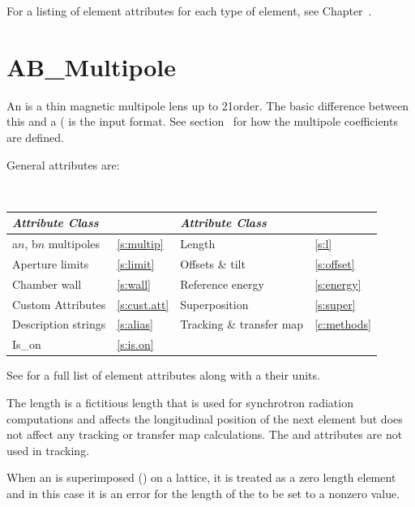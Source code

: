 For a listing of element attributes for each type of element, see Chapter~.

\section{AB_Multipole}
\label{s:ab.m}

An  is a thin magnetic multipole lens up to 21\St order. The
basic difference between this and a  ( is
the input format. See section~ for how the multipole
coefficients are defined.

General  attributes are:
\begin{center}
\tt 
\begin{tabular}{llll} \toprule
  {\sl Attribute Class}      & \s               & {\sl Attribute Class}      & \s              \\ \midrule
  a$n$, b$n$ multipoles      & \ref{s:multip}   & Length                     & \ref{s:l}       \\
  Aperture limits            & \ref{s:limit}    & Offsets \& tilt            & \ref{s:offset}  \\
  Chamber wall               & \ref{s:wall}     & Reference energy           & \ref{s:energy}  \\ 
  Custom Attributes          & \ref{s:cust.att} & Superposition              & \ref{s:super}   \\
  Description strings        & \ref{s:alias}    & Tracking \& transfer map   & \ref{c:methods} \\
  Is_on                      & \ref{s:is.on}    &                            &                 \\
  \bottomrule
\end{tabular}
\end{center}
\toffset
See  for a full list of element attributes along with a their units.

The length  is a fictitious length that is used for synchrotron
radiation computations and affects the longitudinal position of the
next element but does not affect any tracking or transfer map
calculations.  The  and  attributes are not
used in tracking.

When an  is superimposed () on a lattice, it is
treated as a zero length element and in this case it is an error for the length
of the  to be set to a nonzero value.

